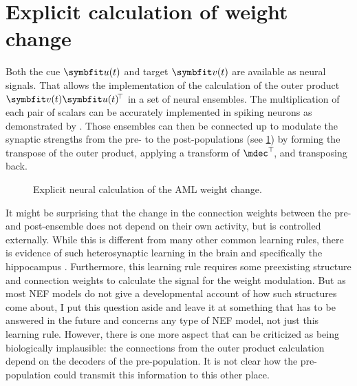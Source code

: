 \section{Explicit calculation of weight change}
Both the cue $\vc u(t)$ and target $\vc v(t)$ are available as neural signals.
That allows the implementation of the calculation of the outer product $\vc v(t) \vc u(t)\!\Tr$ in a set of neural ensembles.
The multiplication of each pair of scalars can be accurately implemented in spiking neurons as demonstrated by \textcite{gosmann2015-1}.
Those ensembles can then be connected up to modulate the synaptic strengths from the pre- to the post-populations (see \cref{fig:aml-explicit}) by forming the transpose of the outer product, applying a transform of $\mdec\Tr\!$, and transposing back.
\begin{figure}
    \centering
    \caption{Explicit neural calculation of the AML weight change.}\label{fig:aml-explicit}
\end{figure}

It might be surprising that the change in the connection weights between the pre- and post-ensemble does not depend on their own activity, but is controlled externally.
While this is different from many other common learning rules, there is evidence of such heterosynaptic learning in the brain and specifically the hippocampus \parencite{huilme2014,rebola2017,uchida2012}.
Furthermore, this learning rule requires some preexisting structure and connection weights to calculate the signal for the weight modulation.
But as most NEF models do not give a developmental account of how such structures come about, I put this question aside and leave it at something that has to be answered in the future and concerns any type of NEF model, not just this learning rule.
However, there is one more aspect that can be criticized as being biologically implausible: the connections from the outer product calculation depend on the decoders of the pre-population.
It is not clear how the pre-population could transmit this information to this other place.

